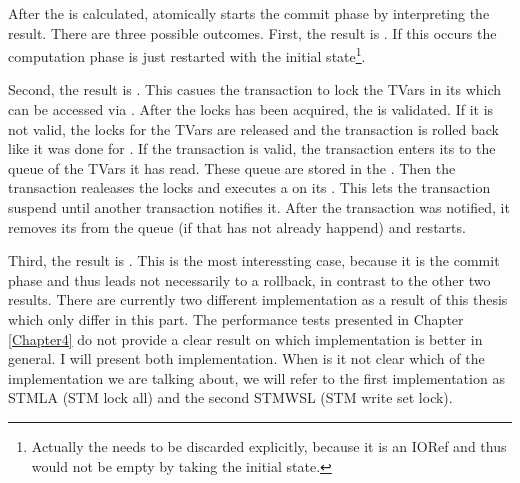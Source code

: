 After the  is calculated, atomically starts the commit phase by interpreting
the result. There are three possible outcomes.
First, the result is . If this occurs the computation phase is just restarted 
with the initial state\footnote{Actually the  needs to be discarded explicitly,
because it is an IORef and thus would not be empty by taking the initial state.}. 

Second, the result is . This casues the transaction to lock the TVars in its 
 which can be accessed via . After the locks has been acquired, 
the  is validated. If it is not valid, the locks for the TVars are released and
the transaction is rolled back like it was done for . If the transaction is 
valid, the transaction enters its  to the queue of the TVars it has read.
These queue are stored in the . Then the transaction realeases the locks and 
executes a  on its . This lets the transaction suspend until
another transaction notifies it. After the transaction was notified, it removes its 
 from the queue (if that has not already happend) and restarts.

Third, the result is . This is the most interessting case, 
because it is the commit phase and thus leads not necessarily to a rollback, in contrast to 
the other two results. 
There are currently two different implementation as a result of this thesis which 
only differ in this part. The performance tests presented in Chapter \ref{Chapter4} do
not provide a clear result on which implementation is better in general. I will present
both implementation. When is it not clear which of the implementation we are talking about,
we will refer to the first implementation as STMLA (STM lock all) and the second STMWSL 
(STM write set lock). 

